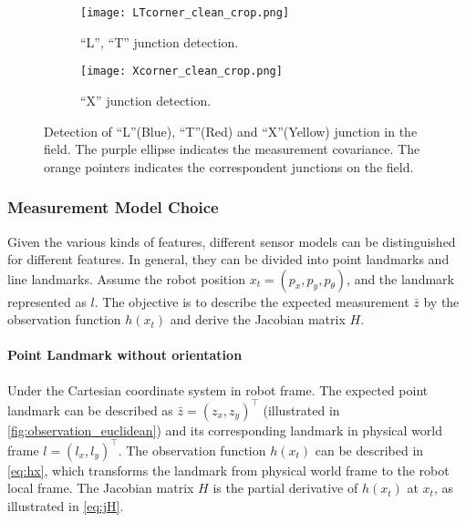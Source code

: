 \begin{figure}[h!]
  \hspace*{\fill}
  \begin{subfigure}[b]{0.4\textwidth}
    \texttt{[image: LTcorner\_clean\_crop.png]}
    \caption{``L'', ``T'' junction detection.}
    \label{fig:LT}
  \end{subfigure}
  \hspace*{\fill}
  \begin{subfigure}[b]{0.381\textwidth}
    \texttt{[image: Xcorner\_clean\_crop.png]}
    \caption{``X'' junction detection.}
    \label{fig:X}
  \end{subfigure}
  \hspace*{\fill}
 \caption[Detection of ``L'', ``T'' and ``X'' junction in the field.]{Detection of ``L''(Blue), ``T''(Red) and ``X''(Yellow) junction in the field. The purple ellipse indicates the measurement covariance. The orange pointers indicates the correspondent junctions on the field.}
  \label{fig:txcorner}
\end{figure}


\subsubsection{Measurement Model Choice}\label{subsub:sensorModelChoice}
Given the various kinds of features, different sensor models can be distinguished for different features. In general, they can be divided into point landmarks and line landmarks. Assume the robot position $x_t = (p_x, p_y, p_{\theta})$, and the landmark represented as $l$. The objective is to describe the expected measurement $\bar{z}$ by the observation function $h(x_t)$ and derive the Jacobian matrix $H$.
\paragraph{Point Landmark without orientation}\label{par:pointLandmark}
Under the Cartesian coordinate system in robot frame. The expected point landmark can be described as $\bar{z} = (z_x, z_y)^\top$ (illustrated in \autoref{fig:observation_euclidean}) and its corresponding landmark in physical world frame $l = (l_x, l_y)^\top$. The observation function $h(x_t)$ can be described in \autoref{eq:hx}, which transforms the landmark from physical world frame to the robot local frame. The Jacobian matrix $H$ is the partial derivative of $h(x_t)$ at $x_t$, as illustrated in \autoref{eq:jH}. 

